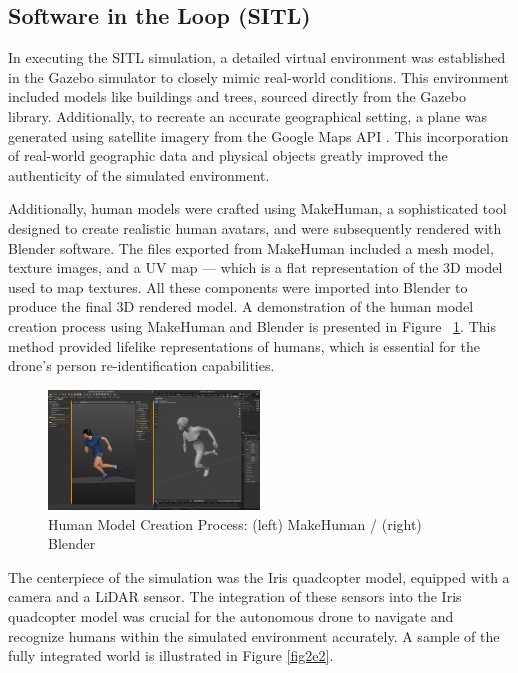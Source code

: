 \subsection{Software in the Loop (SITL)}\label{subsection:E}
In executing the SITL simulation, a detailed virtual environment was established in the Gazebo simulator to closely mimic real-world conditions. This environment included models like buildings and trees, sourced directly from the Gazebo library. Additionally, to recreate an accurate geographical setting, a plane was generated using satellite imagery from the Google Maps API \cite{2e1}. This incorporation of real-world geographic data and physical objects greatly improved the authenticity of the simulated environment.

Additionally, human models were crafted using MakeHuman, a sophisticated tool designed to create realistic human avatars, and were subsequently rendered with Blender software. The files exported from MakeHuman included a mesh model, texture images, and a UV map — which is a flat representation of the 3D model used to map textures. All these components were imported into Blender to produce the final 3D rendered model. A demonstration of the human model creation process using MakeHuman and Blender is presented in Figure ~\ref{fig2e1}. This method provided lifelike representations of humans, which is essential for the drone's person re-identification capabilities.


\begin{figure}[H]
    \centerline{\includegraphics[width=0.5\textwidth]{Figures/Methods/makehuman+blender.png}}
    \caption{Human Model Creation Process: (left) MakeHuman / (right) Blender}
    \label{fig2e1}
\end{figure}

The centerpiece of the simulation was the Iris quadcopter model, equipped with a camera and a LiDAR sensor. The integration of these sensors into the Iris quadcopter model was crucial for the autonomous drone to navigate and recognize humans within the simulated environment accurately. A sample of the fully integrated world is illustrated in Figure \ref{fig2e2}.   

